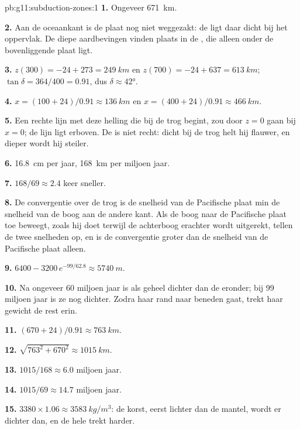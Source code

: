 \begin{solution}{pb:g11:subduction-zones:1}
\textbf{1.} Ongeveer \qty{671}{km}.

\textbf{2.} Aan de oceaankant is de plaat nog niet weggezakt: de 
ligt daar dicht bij het oppervlak. De diepe aardbevingen vinden plaats in de , die
alleen onder de bovenliggende plaat ligt.

\textbf{3.} $z(300) = -24 + 273 = \qty{249}{km}$ en
$z(700) = -24 + 637 = \qty{613}{km}$; $\tan\delta = 364/400 = 0.91$, dus
$\delta \approx \ang{42}$.

\textbf{4.} $x = (100 + 24)/0.91 \approx \qty{136}{km}$ en
$x = (400 + 24)/0.91 \approx \qty{466}{km}$.

\textbf{5.} Een rechte lijn met deze helling die bij de trog begint, zou
door $z = 0$ gaan bij $x = 0$; de lijn ligt erboven. De  is niet recht: dicht bij de
trog helt hij flauwer, en dieper wordt hij steiler.

\textbf{6.} \qty{16.8}{cm} per jaar, \qty{168}{km} per miljoen jaar.

\textbf{7.} $168/69 \approx 2.4$ keer sneller.

\textbf{8.} De convergentie over de trog is de snelheid van de Pacifische
plaat min de snelheid van de boog aan de andere kant. Als de boog naar
de Pacifische plaat toe beweegt, zoals hij doet terwijl de achterboog erachter wordt uitgerekt, tellen de
twee snelheden op, en is de convergentie groter dan de snelheid van de
Pacifische plaat alleen.

\textbf{9.} $6400 - 3200\,e^{-99/62.8} \approx \qty{5740}{m}$.

\textbf{10.} Na ongeveer 60 miljoen jaar is  als geheel dichter
dan de  eronder; bij 99 miljoen jaar is ze nog dichter.
Zodra haar rand naar beneden gaat, trekt haar gewicht de rest erin.

\textbf{11.} $(670 + 24)/0.91 \approx \qty{763}{km}$.

\textbf{12.} $\sqrt{763^2 + 670^2} \approx \qty{1015}{km}$.

\textbf{13.} $1015/168 \approx 6.0$ miljoen jaar.

\textbf{14.} $1015/69 \approx 14.7$ miljoen jaar.

\textbf{15.} $3380 \times 1.06 \approx \qty{3583}{kg/m^3}$: de korst, eerst
lichter dan de mantel, wordt er dichter dan, en de hele  trekt
harder.


\end{solution}
